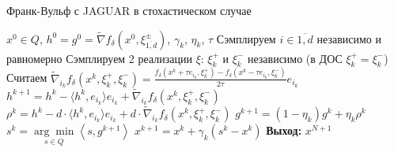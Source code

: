 \documentclass{beamer}
\begin{document}
\begin{frame}{Франк-Вульф с JAGUAR в стохастическом случае}

    \begin{algorithm}[H]
        \caption{ФВ с JAGUAR в стохастическом случае}
        \begin{algorithmic}[1]
         $x^0 \in Q$, $h^0 = g^0 = \widetilde\nabla f_{\delta}(x^0, \xi_{\overline{1, d}}^\pm)$, $\gamma_k$, $\eta_k$, $\tau$
            \State Сэмплируем $i \in \overline{1, d}$ независимо и равномерно
            \State Сэмплируем 2 реализации $\xi$: $\xi^+_k$ и $\xi^-_k$ независимо (в ДОС $\xi_k^+= \xi_k^-$)
            \State Считаем $\widetilde{\nabla}_{i_k} f_{\delta}(x^k, \xi^+_k, \xi^-_k) = \frac{f_{\delta}(x^k + \tau e_{i_k}, \xi^+_k) - f_{\delta}(x^k - \tau e_{i_k}, \xi^-_k)}{2 \tau} e_{i_k}$
            \State $h^{k+1} = h^k - \langle h^k, e_{i_k} \rangle e_{i_k} + \widetilde{\nabla}_{i_k} f_{\delta}(x^k, \xi^+_k, \xi^-_k)$
            \State $\rho^{k} = h^{k} - d \cdot \langle h^{k}, e_{i_k} \rangle e_{i_k} + d \cdot \widetilde{\nabla}_{i_k} f_{\delta}(x^k, \xi^+_k, \xi^-_k)$
            \State $g^{k+1} = (1 - \eta_k) g^k + \eta_k \rho^k$
            \State $s^k = \underset{s \in Q}{\arg\min}\left<s, g^{k+1} \right>$
            \State $x^{k+1} = x^k + \gamma_k (s^k - x^k)$
        \EndFor
        \State \textbf{Выход:} $x^{N + 1}$
        \end{algorithmic}
   \end{algorithm}
  
\end{frame}

\end{document}
